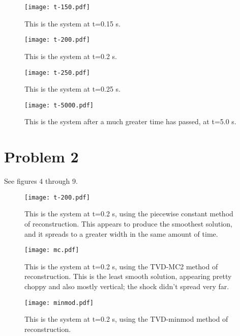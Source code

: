 \documentclass[11pt,letterpaper]{article}
\begin{document}
\begin{figure}[bth]
\centering
\texttt{[image: t-150.pdf]}
\caption{This is the system at t=0.15 s.}
\label{fig:simpleplot2}
\end{figure}

\begin{figure}[bth]
\centering
\texttt{[image: t-200.pdf]}
\caption{This is the system at t=0.2 s.}
\label{fig:simpleplot2}
\end{figure}

\begin{figure}[bth]
\centering
\texttt{[image: t-250.pdf]}
\caption{This is the system at t=0.25 s.}
\label{fig:simpleplot2}
\end{figure}

\begin{figure}[bth]
\centering
\texttt{[image: t-5000.pdf]}
\caption{This is the system after a much greater time has passed, at t=5.0 s.}
\label{fig:simpleplot2}
\end{figure}

\section*{Problem 2}

See figures 4 through 9.

\begin{figure}[bth]
\centering
\texttt{[image: t-200.pdf]}
\caption{This is the system at t=0.2 s, using the piecewise constant method of reconstruction. This appears to produce the smoothest solution, and it spreads to a greater width in the same amount of time.}
\label{fig:simpleplot2}
\end{figure}

\begin{figure}[bth]
\centering
\texttt{[image: mc.pdf]}
\caption{This is the system at t=0.2 s, using the TVD-MC2 method of reconstruction. This is the least smooth solution, appearing pretty choppy and also mostly vertical; the shock didn't spread very far.}
\label{fig:simpleplot2}
\end{figure}

\begin{figure}[bth]
\centering
\texttt{[image: minmod.pdf]}
\caption{This is the system at t=0.2 s, using the TVD-minmod method of reconstruction.}
\label{fig:simpleplot2}
\end{figure}
\end{document}
